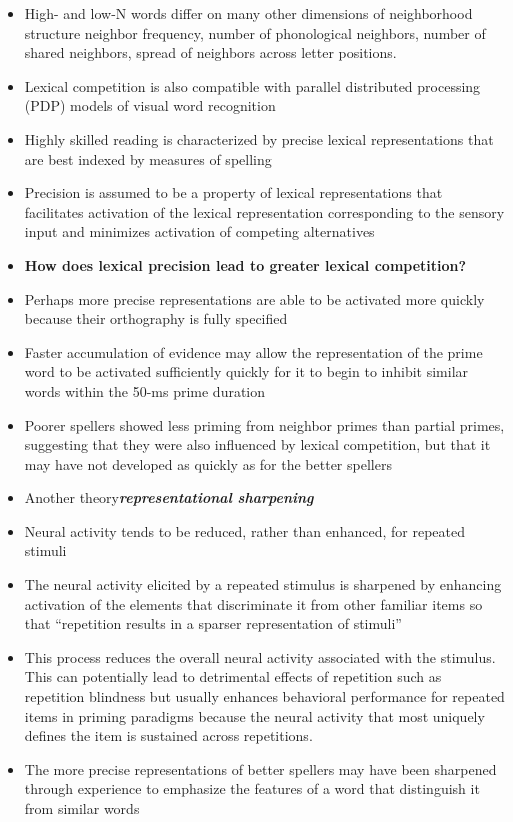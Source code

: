 \documentclass[]{article}
\begin{document}
\begin{itemize}
			\item High- and low-N words differ on many other dimensions of neighborhood structure \textemdash neighbor frequency, number of phonological neighbors, number of shared neighbors, spread of neighbors across letter positions.
			\item Lexical competition is also compatible with parallel distributed processing (PDP) models of visual word recognition
			\item Highly skilled reading is characterized by precise lexical representations that are best indexed by measures of spelling
			\item Precision is assumed to be a property of lexical representations that facilitates activation of the lexical representation corresponding to the sensory input and minimizes activation of competing alternatives
			\item \textbf{How does lexical precision lead to greater lexical competition?}
			\item Perhaps more precise representations are able to be activated more quickly because their orthography is fully specified
			\item Faster accumulation of evidence may allow the representation of the prime word to be activated sufficiently quickly for it to begin to inhibit similar words within the 50-ms prime duration
			\item Poorer spellers showed less priming from neighbor primes than partial primes, suggesting that they were also influenced by lexical competition, but that it may have not developed as quickly as for the better spellers
			\item Another theory\textemdash \textbf{\textit{representational sharpening}}
			\item Neural activity tends to be reduced, rather than enhanced, for repeated stimuli
			\item The neural activity elicited by a repeated stimulus is sharpened by enhancing activation of the elements that discriminate it from other familiar items so that “repetition results in a sparser representation of stimuli”
			\item This process reduces the overall neural activity associated 	with the stimulus. This can potentially lead to detrimental effects of repetition such as repetition blindness but usually enhances behavioral performance for repeated items in priming paradigms because the neural activity that most uniquely defines the item is sustained across repetitions.
			\item The more precise representations of better spellers may have been sharpened through experience to emphasize the features of a word that distinguish it from similar words

\end{itemize}
\end{document}
